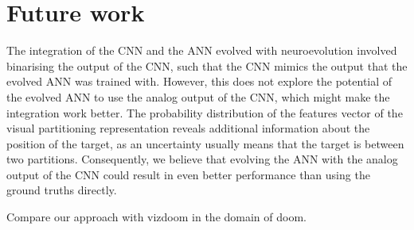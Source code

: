\section{Future work}
The integration of the CNN and the ANN evolved with neuroevolution involved binarising the output of the CNN, such that the CNN mimics the output that the evolved ANN was trained with. However, this does not explore the potential of the evolved ANN to use the analog output of the CNN, which might make the integration work better. The probability distribution of the features vector of the visual partitioning representation reveals additional information about the position of the target, as an uncertainty usually means that the target is between two partitions. Consequently, we believe that evolving the ANN with the analog output of the CNN could result in even better performance than using the ground truths directly.

Compare our approach with vizdoom in the domain of doom.